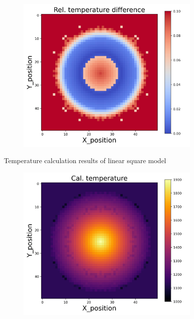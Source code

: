 {\begin{figure}[h]
\begin{minipage}{\textwidth}
\begin{subfigure}{0.27\textwidth}
        \end{subfigure}
        \begin{subfigure}{0.27\textwidth}
            \centering
            \includegraphics[width=\textwidth]{figures/raw_data/33/lin_square/T_bias.jpg}
        \end{subfigure}
    \end{minipage}
    \caption{Temperature calculation results of linear square model}  
\end{figure}
\begin{figure}[p]
    \centering
    \begin{minipage}{\textwidth}
        \centering
        \begin{subfigure}{0.325\textwidth}
            \centering
            \includegraphics[width=\textwidth]{figures/raw_data/0/lin_square/T_cal.jpg}

\end{subfigure}
\end{minipage}
\end{figure}}
